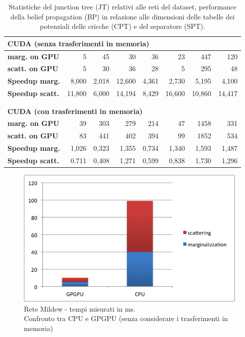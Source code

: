 \documentclass[a4paper]{article}   %
\begin{document}
\begin{table}
\begin{tabular}{ l | r | r | r | r | r | r | r }
\multicolumn{8}{l}{\textbf{CUDA (senza trasferimenti in memoria)}} \\
\hline
\textbf{marg. on GPU} &	5 &	45 &	30 &	36 &	23 &		447	& 120 \\
\hline
\textbf{scatt. on GPU} &	5 &	30 &	36 &	28 &	5	&	295 &	48 \\
\hline
\textbf{Speedup marg.} & 8,000 &	2,018 &	12,600 &	4,361 &	2,730	&	5,195 &	4,100 \\
\hline
\textbf{Speedup scatt.} & 11,800 &	6,000 &	14,194 &		8,429 &	16,600 &		10,860 &	14,417 \\
\multicolumn{8}{l}{ }	\\
\multicolumn{8}{l}{ }	\\								

\multicolumn{8}{l}{\textbf{CUDA (con trasferimenti in memoria)}} \\
\hline
\textbf{marg. on GPU} &	39 &	303	& 279 &	214 &	47 &		1458 &	331 \\
\hline
\textbf{scatt. on GPU} &	83	& 441 &	402	& 394 &	99 &		1852 &	534 \\
\hline
\textbf{Speedup marg.} & 1,026 & 0,323	  & 1,355	 & 0,734	 & 1,340	& 1,593	 & 1,487 \\
\hline
\textbf{Speedup scatt.} & 0.711 & 0,408 & 1,271	 & 0,599 & 0,838	& 1,730	 & 1,296	 \\
\end{tabular}
\caption{Statistiche del junction tree (JT) relativi alle reti del dataset, performance della belief propagation (BP) in relazione alle dimensioni delle tabelle dei potenziali delle cricche (CPT) e del separatore (SPT).} %
\label{tab:tempi}
\end{table}

\begin{figure}[p]
\centering
\includegraphics[scale=0.8]{Mildew.png}
\caption{Rete Mildew - tempi misurati in ms.\\Confronto tra CPU e GPGPU (senza considerare i trasferimenti in memoria)} 
\label{graficoMildew}
\end{figure}
\end{document}
